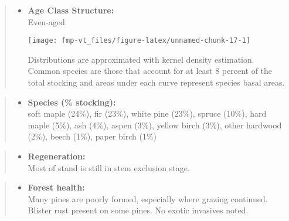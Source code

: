 \documentclass[]{tufte-handout}
\providecommand{\tightlist}{%
  \setlength{\itemsep}{0pt}\setlength{\parskip}{0pt}}
\begin{document}
\begin{quote}
\begin{itemize}
\tightlist
\item
  \textbf{Age Class Structure:}\\
  \vspace{2pt} Even-aged\\

  \begin{marginfigure}
  \texttt{[image: fmp-vt\_files/figure-latex/unnamed-chunk-17-1]} \caption[Distributions are approximated with kernel density estimation]{Distributions are approximated with kernel density estimation. Common species are those that account for at least 8 percent of the total stocking and areas under each curve represent species basal areas.}\label{fig:unnamed-chunk-17}
  \end{marginfigure}
\end{itemize}
\end{quote}

\begin{quote}
\begin{itemize}
\tightlist
\item
  \textbf{Species (\% stocking):}\\
  \vspace{2pt} soft maple (24\%), fir (23\%), white pine (23\%), spruce
  (10\%), hard maple (5\%), ash (4\%), aspen (3\%), yellow birch (3\%),
  other hardwood (2\%), beech (1\%), paper birch (1\%)
\end{itemize}
\end{quote}

\begin{quote}
\begin{itemize}
\tightlist
\item
  \textbf{Regeneration:}\\
  \vspace{2pt} Most of stand is still in stem exclusion stage.
\end{itemize}
\end{quote}

\begin{quote}
\begin{itemize}
\tightlist
\item
  \textbf{Forest health:}\\
  \vspace{2pt} Many pines are poorly formed, especially where grazing
  continued. Blister rust present on some pines. No exotic invasives
  noted.
\end{itemize}
\end{quote}
\end{document}
